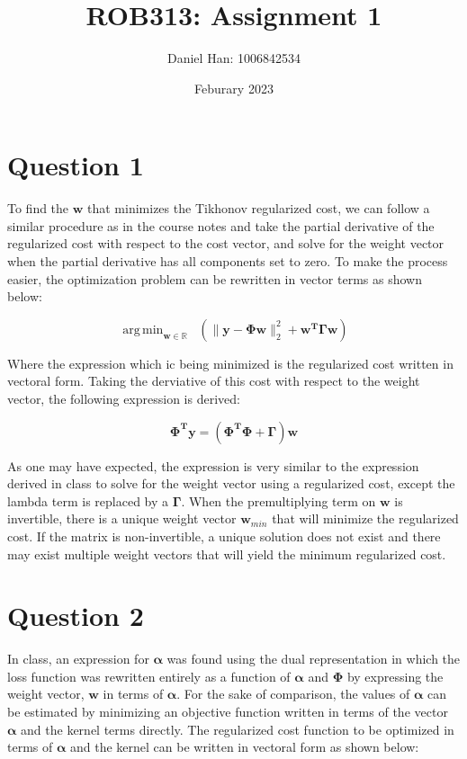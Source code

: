 \documentclass{article}
\title{ROB313: Assignment 1}
\author{Daniel Han: 1006842534}
\date{Feburary 2023}
\DeclareMathOperator*{\argmin}{arg\,min}
\begin{document}
\maketitle

\iffalse
\section*{Question 1}
To find the $\textbf{w}$ that minimizes the Tikhonov regularized cost, we can follow a similar procedure as in the course notes and take the partial derivative of the regularized cost with respect to the cost vector, and solve for the weight vector when the partial derivative has all components set to zero. To make the process easier, the optimization problem can be rewritten in vector terms as shown below:

\begin{equation}
\argmin_{\textbf{w} \in \mathbb{R}} \;\;  (\| \textbf{y} - \mathbf{\Phi}\mathbf{w} \|_2^2 + \mathbf{w^T}\mathbf{\Gamma}\mathbf{w})
\end{equation}

Where the expression which ic being minimized is the regularized cost written in vectoral form. Taking the derviative of this cost with respect to the weight vector, the following expression is derived:

\begin{equation}
\mathbf{\Phi^T}\mathbf{y} = (\mathbf{\Phi^T \Phi} + \mathbf{\Gamma})\mathbf{w}
\end{equation}

As one may have expected, the expression is very similar to the expression derived in class to solve for the weight vector using a regularized cost, except the lambda term is replaced by a $\mathbf{\Gamma}$. When the premultiplying term on $\mathbf{w}$ is invertible, there is a unique weight vector $\mathbf{w}_{min}$ that will minimize the regularized cost. If the matrix is non-invertible, a unique solution does not exist and there may exist multiple weight vectors that will yield the minimum regularized cost.

\section*{Question 2}
In class, an expression for $\boldsymbol\alpha$ was found using the dual representation in which the loss function was rewritten entirely as a function of $\boldsymbol\alpha$ and $\mathbf{\Phi}$ by expressing the weight vector, $\mathbf{w}$ in terms of $\boldsymbol\alpha$. For the sake of comparison, the values of $\boldsymbol\alpha$ can be estimated by minimizing an objective function written in terms of the vector $\boldsymbol\alpha$ and the kernel terms directly. The regularized cost function to be optimized in terms of $\boldsymbol\alpha$ and the kernel can be written in vectoral form as shown below:
\end{document}
